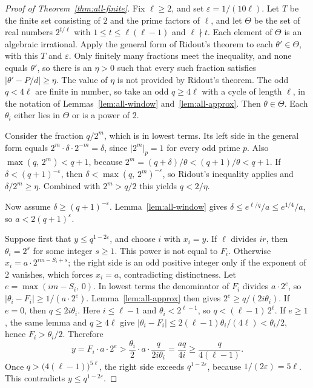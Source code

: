 \documentclass[11pt]{article}
\begin{document}
\begin{proof}[Proof of Theorem~\ref{thm:all-finite}]
Fix $\ell \ge 2$, and set $\varepsilon = 1/(10\ell)$.
Let $T$ be the finite set consisting of $2$ and the prime factors of $\ell$, and let $\Theta$ be the set of real numbers $2^{t/\ell}$ with $1 \le t \le \ell(\ell-1)$ and $\ell \nmid t$.
Each element of $\Theta$ is an algebraic irrational.
Apply the general form of Ridout's theorem to each $\theta' \in \Theta$, with this $T$ and $\varepsilon$.
Only finitely many fractions meet the inequality, and none equals $\theta'$, so there is an $\eta > 0$ such that every such fraction satisfies $\lvert \theta' - P/d \rvert \ge \eta$.
The value of $\eta$ is not provided by Ridout's theorem.
The odd $q < 4\ell$ are finite in number, so take an odd $q \ge 4\ell$ with a cycle of length $\ell$, in the notation of Lemmas~\ref{lem:all-window} and~\ref{lem:all-approx}.
Then $\theta \in \Theta$.
Each $\theta_i$ either lies in $\Theta$ or is a power of $2$.

Consider the fraction $q/2^m$, which is in lowest terms.
Its left side in the general form equals $2^m \cdot \delta \cdot 2^{-m} = \delta$, since $\lvert 2^m \rvert_p = 1$ for every odd prime $p$.
Also $\max(q,\, 2^m) < q+1$, because $2^m = (q+\delta)/\theta < (q+1)/\theta < q+1$.
If $\delta < (q+1)^{-\varepsilon}$, then $\delta < \max(q,\, 2^m)^{-\varepsilon}$, so Ridout's inequality applies and $\delta/2^m \ge \eta$.
Combined with $2^m > q/2$ this yields $q < 2/\eta$.

Now assume $\delta \ge (q+1)^{-\varepsilon}$.
Lemma~\ref{lem:all-window} gives $\delta \le e^{\ell/q}/a \le e^{1/4}/a$, so $a < 2(q+1)^\varepsilon$.

Suppose first that $y \le q^{1-2\varepsilon}$, and choose $i$ with $x_i = y$.
If $\ell$ divides $ir$, then $\theta_i = 2^s$ for some integer $s \ge 1$.
This power is not equal to $F_i$.
Otherwise $x_i = a \cdot 2^{im - S_i + s}$; the right side is an odd positive integer only if the exponent of $2$ vanishes, which forces $x_i = a$, contradicting distinctness.
Let $e = \max(im - S_i,\, 0)$.
In lowest terms the denominator of $F_i$ divides $a \cdot 2^e$, so $\lvert \theta_i - F_i \rvert \ge 1/(a \cdot 2^e)$.
Lemma~\ref{lem:all-approx} then gives $2^e \ge q/(2i\theta_i)$.
If $e = 0$, then $q \le 2i\theta_i$.
Here $i \le \ell-1$ and $\theta_i < 2^{\ell-1}$, so $q < (\ell-1)\, 2^\ell$.
If $e \ge 1$, the same lemma and $q \ge 4\ell$ give $\lvert \theta_i - F_i \rvert \le 2(\ell-1)\theta_i/(4\ell) < \theta_i/2$, hence $F_i > \theta_i/2$.
Therefore
\[
y = F_i \cdot a \cdot 2^e > \frac{\theta_i}{2} \cdot a \cdot \frac{q}{2i\theta_i} = \frac{aq}{4i} \ge \frac{q}{4(\ell-1)}.
\]
Once $q > \bigl(4(\ell-1)\bigr)^{5\ell}$, the right side exceeds $q^{1-2\varepsilon}$, because $1/(2\varepsilon) = 5\ell$.
This contradicts $y \le q^{1-2\varepsilon}$.


\end{proof}
\end{document}
